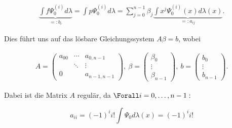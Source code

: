 \begin{solution}
\begin{align*}
    \underbrace{\int f \Psi_0^{(i)} d \lambda}_{=: b_i}
    = \int p \Psi_0^{(i)} d \lambda
    = \sum_{j=0}^{n-1}
      \beta_j
      \underbrace{\int x^j \Psi_0^{(i)}(x) d \lambda(x)}_{=: a_{ij}}.
\end{align*}

Dies führt uns auf das lösbare Gleichungssystem $A \beta = b$, wobei

\begin{align*}
  A =
  \begin{pmatrix}
    a_{00} & \cdots & a_{0, n-1}   \\
           & \ddots & \vdots       \\
    0      &        & a_{n-1, n-1}
  \end{pmatrix}, \:
  \beta =
  \begin{pmatrix}
  \beta_0 \\
  \vdots  \\
  \beta_{n-1}
  \end{pmatrix}, \:
  b =
  \begin{pmatrix}
    b_0    \\
    \vdots \\
    b_{n-1}
  \end{pmatrix}.
\end{align*}

 Dabei ist die Matrix $A$ regulär, da $\Forall i = 0, \ldots, n-1:$

 \begin{equation*}
   a_{ii} = (-1)^ii!\int\Psi_0 d\lambda(x) = (-1)^ii!
 \end{equation*}

\end{solution}
